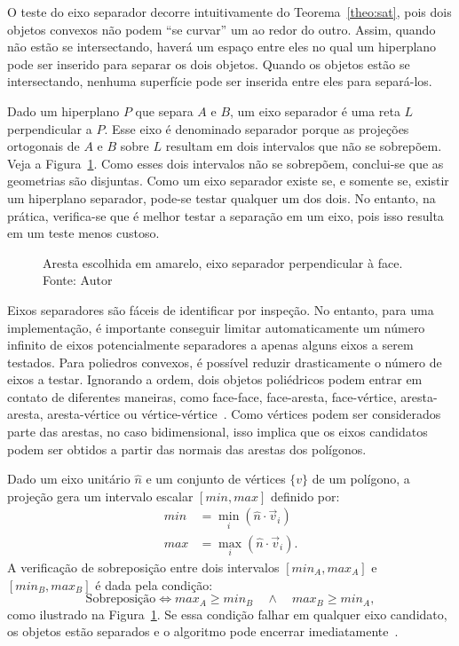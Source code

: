 O teste do eixo separador decorre intuitivamente do Teorema~\ref{theo:sat}, pois dois objetos convexos não podem ``se curvar'' um ao redor do outro. Assim, quando não estão se intersectando, haverá um espaço entre eles no qual um hiperplano pode ser inserido para separar os dois objetos. Quando os objetos estão se intersectando, nenhuma superfície pode ser inserida entre eles para separá-los.~\cite{ericson2004real}


Dado um hiperplano $P$ que separa $A$ e $B$, um eixo separador é uma reta $L$ perpendicular a $P$. Esse eixo é denominado separador porque as projeções ortogonais de $A$ e $B$ sobre $L$ resultam em dois intervalos que não se sobrepõem. Veja a Figura~\ref{fig:eixo-separador}. Como esses dois intervalos não se sobrepõem, conclui-se que as geometrias são disjuntas. Como um eixo separador existe se, e somente se, existir um hiperplano separador, pode-se testar qualquer um dos dois. No entanto, na prática, verifica-se que é melhor testar a separação em um eixo, pois isso resulta em um teste menos custoso.

\begin{figure}[htb]
	\centering
	
	\caption{Aresta escolhida em amarelo, eixo separador perpendicular à face. Fonte: Autor}
	\label{fig:eixo-separador}
\end{figure}

Eixos separadores são fáceis de identificar por inspeção. No entanto, para uma implementação, é importante conseguir limitar automaticamente um número infinito de eixos potencialmente separadores a apenas alguns eixos a serem testados. Para poliedros convexos, é possível reduzir drasticamente o número de eixos a testar. Ignorando a ordem, dois objetos poliédricos podem entrar em contato de diferentes maneiras, como face-face, face-aresta, face-vértice, aresta-aresta, aresta-vértice ou vértice-vértice~\cite{ericson2004real}. Como vértices podem ser considerados parte das arestas, no caso bidimensional, isso implica que os eixos candidatos podem ser obtidos a partir das normais das arestas dos polígonos.

Dado um eixo unitário $\hat{n}$ e um conjunto de vértices $\{ v \}$ de um polígono, a projeção gera um intervalo escalar $[min, max]$ definido por:
\begin{align*}
	min &= \min_i (\hat{n} \cdot \vec v_i) \\
	max &= \max_i (\hat{n} \cdot \vec v_i).
\end{align*}
A verificação de sobreposição entre dois intervalos $[min_A, max_A]$ e $[min_B, max_B]$ é dada pela condição:
$$
	\text{Sobreposição} \iff max_A \geq min_B \quad \land \quad max_B \geq min_A,
$$
como ilustrado na Figura~\ref{fig:eixo-separador}. Se essa condição falhar em qualquer eixo candidato, os objetos estão separados e o algoritmo pode encerrar imediatamente~\cite{dyn4j_sat_2010}.

